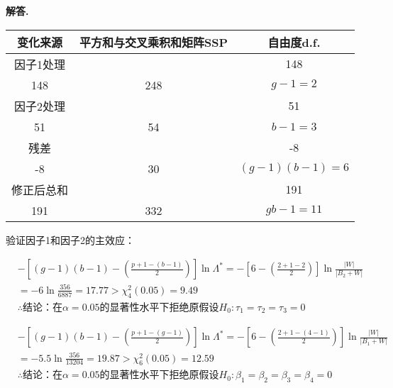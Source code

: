\documentclass[12pt, a4paper, oneside]{ctexart}
\newenvironment{solution}{\par\noindent\textbf{解答. }}{\par}
\begin{document}
\begin{solution}
\begin{table}[htb]
    \centering
    \begin{tabular}{ccc}
    \toprule
    \rowcolor[HTML]{C0C0C0}
    变化来源  & 平方和与交叉乘积和矩阵SSP & 自由度d.f.   \\
    \midrule
    因子1处理    & \(B_1=\begin{bmatrix} 104 & 148 \\ 148 & 248 \end{bmatrix} \)   & \(g-1=2\)    \\
    因子2处理    & \(B_2=\begin{bmatrix} 90 & 51 \\ 51 & 54 \end{bmatrix} \)   & \(b-1=3\)    \\
    残差    & \(W=\begin{bmatrix} 14 & -8 \\ -8 & 30 \end{bmatrix} \)             & \((g-1)(b-1)=6\)\\
    \midrule
    修正后总和 & \(B_1+B_2+W=\begin{bmatrix} 208 & 191 \\ 191 & 332 \end{bmatrix} \) & \(gb-1=11\)   \\
    \bottomrule
    \end{tabular}
\end{table}

验证因子1和因子2的主效应：

\[
    \begin{aligned}
        &- \left[ {(g-1)(b-1)-\left( {\frac{p+1-(b-1)}{2}} \right) } \right] \ln \Lambda^\ast
        =-\left[ { 6- \left( \frac{2+1-2}{2} \right) }\right] \ln{\frac{|W|}{|B_2+W|}}\\
        &=-6\ln{\frac{356}{6887}}=17.77 >\chi^2_{4}(0.05)=9.49\\ 
        &\therefore \text{结论：在}\alpha=0.05\text{的显著性水平下拒绝原假设}H_0:\tau_1=\tau_2=\tau_3=0
    \end{aligned}
\]

\[
    \begin{aligned}
        &- \left[ {(g-1)(b-1)-\left( {\frac{p+1-(g-1)}{2}} \right) } \right] \ln \Lambda^\ast
        =-\left[ { 6- \left( \frac{2+1-(4-1)}{2} \right) }\right] \ln{\frac{|W|}{|B_1+W|}}\\
        &=-5.5\ln{\frac{356}{13204}}=19.87> \chi^2_{6}(0.05)=12.59\\
        &\therefore \text{结论：在}\alpha=0.05\text{的显著性水平下拒绝原假设}H_0:\beta_1=\beta_2=\beta_3=\beta_4=0
    \end{aligned}
\]

\end{solution}
\end{document}
